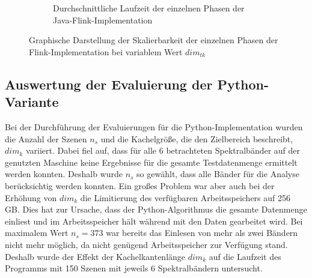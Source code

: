 \begin{figure}
\begin{subfigure}[b]{0.45\textwidth}
{}
		\caption{Durchschnittliche Laufzeit der einzelnen Phasen der Java-Flink-Implementation}
  		\label{fig:diagrammJavaFlinkDimTKPhases}
	\end{subfigure}
\captionsetup{justification=centering, margin=2cm}
\caption{Graphische Darstellung der Skalierbarkeit der einzelnen Phasen der Flink-Implementation bei variablem Wert $dim_{tk}$}
\label{fig:diagrammsPython}
\end{figure}

\subsection{Auswertung der Evaluierung der Python-Variante}
Bei der Durchführung der Evaluierungen für die Python-Implementation wurden die Anzahl der Szenen $n_s$ und die Kachelgröße, die den Zielbereich beschreibt, $dim_k$ variiert. Dabei fiel auf, dass für alle 6 betrachteten Spektralbänder auf der genutzten Maschine keine Ergebnisse für die gesamte Testdatenmenge ermittelt werden konnten. Deshalb wurde $n_s$ so gewählt, dass alle Bänder für die Analyse berücksichtig werden konnten. Ein großes Problem war aber auch bei der Erhöhung von $dim_k$ die Limitierung des verfügbaren Arbeitsspeichers auf 256 GB. Dies hat zur Ursache, dass der Python-Algorithmus die gesamte Datenmenge einliest und im Arbeitsspeicher hält während mit den Daten gearbeitet wird. Bei maximalem Wert $n_s = 373$ war bereits das Einlesen von mehr als zwei Bändern nicht mehr möglich, da nicht genügend Arbeitsspeicher zur Verfügung stand. Deshalb wurde der Effekt der Kachelkantenlänge $dim_k$ auf die Laufzeit des Programms mit 150 Szenen mit jeweils 6 Spektralbändern untersucht. 

